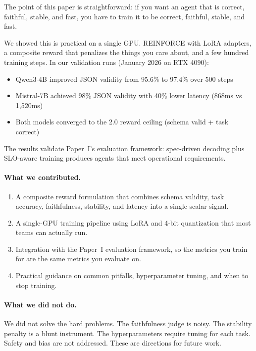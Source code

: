 \documentclass[11pt]{article}
\begin{document}
The point of this paper is straightforward: if you want an agent that is correct, faithful, stable, and fast, you have to train it to be correct, faithful, stable, and fast.

We showed this is practical on a single GPU.
REINFORCE with LoRA adapters, a composite reward that penalizes the things you care about, and a few hundred training steps.
In our validation runs (January 2026 on RTX 4090):
\begin{itemize}[leftmargin=12pt]
    \item Qwen3-4B improved JSON validity from 95.6\% to 97.4\% over 500 steps
    \item Mistral-7B achieved 98\% JSON validity with 40\% lower latency (868ms vs 1,520ms)
    \item Both models converged to the 2.0 reward ceiling (schema valid + task correct)
\end{itemize}
The results validate Paper~I's evaluation framework: spec-driven decoding plus SLO-aware training produces agents that meet operational requirements.

\paragraph{What we contributed.}
\begin{enumerate}[leftmargin=12pt]
    \item A composite reward formulation that combines schema validity, task accuracy, faithfulness, stability, and latency into a single scalar signal.
    \item A single-GPU training pipeline using LoRA and 4-bit quantization that most teams can actually run.
    \item Integration with the Paper~I evaluation framework, so the metrics you train for are the same metrics you evaluate on.
    \item Practical guidance on common pitfalls, hyperparameter tuning, and when to stop training.
\end{enumerate}

\paragraph{What we did not do.}
We did not solve the hard problems.
The faithfulness judge is noisy.
The stability penalty is a blunt instrument.
The hyperparameters require tuning for each task.
Safety and bias are not addressed.
These are directions for future work.
\end{document}
